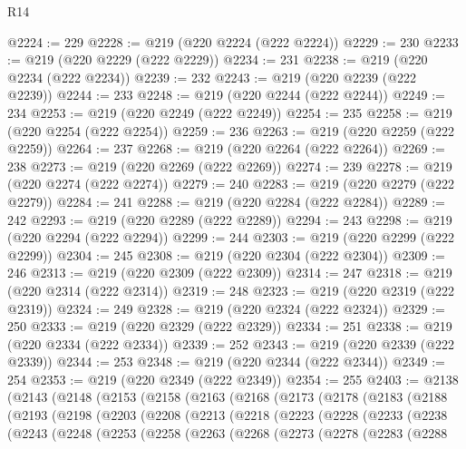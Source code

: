 \begin{lexlean}{R14}
\begin{coremodule}
@2224 := 229
@2228 := @219 (@220 @2224 (@222 @2224))
@2229 := 230
@2233 := @219 (@220 @2229 (@222 @2229))
@2234 := 231
@2238 := @219 (@220 @2234 (@222 @2234))
@2239 := 232
@2243 := @219 (@220 @2239 (@222 @2239))
@2244 := 233
@2248 := @219 (@220 @2244 (@222 @2244))
@2249 := 234
@2253 := @219 (@220 @2249 (@222 @2249))
@2254 := 235
@2258 := @219 (@220 @2254 (@222 @2254))
@2259 := 236
@2263 := @219 (@220 @2259 (@222 @2259))
@2264 := 237
@2268 := @219 (@220 @2264 (@222 @2264))
@2269 := 238
@2273 := @219 (@220 @2269 (@222 @2269))
@2274 := 239
@2278 := @219 (@220 @2274 (@222 @2274))
@2279 := 240
@2283 := @219 (@220 @2279 (@222 @2279))
@2284 := 241
@2288 := @219 (@220 @2284 (@222 @2284))
@2289 := 242
@2293 := @219 (@220 @2289 (@222 @2289))
@2294 := 243
@2298 := @219 (@220 @2294 (@222 @2294))
@2299 := 244
@2303 := @219 (@220 @2299 (@222 @2299))
@2304 := 245
@2308 := @219 (@220 @2304 (@222 @2304))
@2309 := 246
@2313 := @219 (@220 @2309 (@222 @2309))
@2314 := 247
@2318 := @219 (@220 @2314 (@222 @2314))
@2319 := 248
@2323 := @219 (@220 @2319 (@222 @2319))
@2324 := 249
@2328 := @219 (@220 @2324 (@222 @2324))
@2329 := 250
@2333 := @219 (@220 @2329 (@222 @2329))
@2334 := 251
@2338 := @219 (@220 @2334 (@222 @2334))
@2339 := 252
@2343 := @219 (@220 @2339 (@222 @2339))
@2344 := 253
@2348 := @219 (@220 @2344 (@222 @2344))
@2349 := 254
@2353 := @219 (@220 @2349 (@222 @2349))
@2354 := 255
@2403 := @2138
    (@2143
      (@2148
        (@2153
          (@2158
            (@2163
              (@2168
                (@2173
                  (@2178
                    (@2183
                      (@2188
                        (@2193
                          (@2198
                            (@2203
                              (@2208
                                (@2213
                                  (@2218
                                    (@2223
                                      (@2228
                                        (@2233
                                          (@2238
                                            (@2243
                                              (@2248
                                                (@2253
                                                  (@2258
                                                    (@2263
                                                      (@2268
                                                        (@2273
                                                          (@2278
                                                            (@2283
                                                              (@2288

\end{coremodule}
\end{lexlean}
